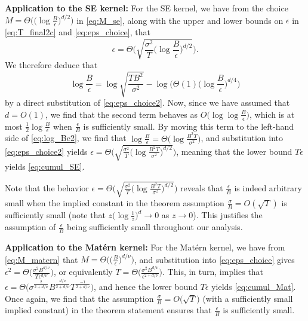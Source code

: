 \documentclass[english,onecolumn,final,11pt]{IEEEtran} %
\begin{document}
{\bf Application to the SE kernel:} For the SE kernel, we have from the choice $M = \Theta\big( \big(\log\frac{B}{\epsilon}\big)^{d/2} \big)$ in \eqref{eq:M_se}, along with the upper and lower bounds on $\epsilon$ in \eqref{eq:T_final2c} and \eqref{eq:eps_choice}, that 
\begin{equation}
    \epsilon = \Theta\bigg( \sqrt{\frac{\sigma^2}{T} \Big( \log\frac{B}{\epsilon} \Big)^{d/2} } \bigg). \label{eq:eps_choice2}
\end{equation}
We therefore deduce that
\begin{equation}
    \log\frac{B}{\epsilon} = \log\sqrt{\frac{TB^2}{\sigma^2}} - \log\bigg( \Theta(1) \Big( \log\frac{B}{\epsilon} \Big)^{d/4} \bigg) \label{eq:log_Be2}
\end{equation}
by a direct substitution of \eqref{eq:eps_choice2}.  Now, since we have assumed that $d = O(1)$, we find that the second term behaves as $O\big(\log\log\frac{B}{\epsilon}\big)$, which is at most $\frac{1}{2}\log\frac{B}{\epsilon}$ when $\frac{\epsilon}{B}$ is sufficiently small.  By moving this term to the left-hand side of \eqref{eq:log_Be2}, we find that $\log\frac{B}{\epsilon} = \Theta\big( \log\frac{B^2 T}{\sigma^2} \big)$, and substitution into \eqref{eq:eps_choice2} yields  $\epsilon = \Theta\big( \sqrt{\frac{\sigma^2}{T} \big( \log\frac{B^2 T}{\sigma^2} \big)^{d/2} } \big)$, meaning that the lower bound $T\epsilon$ yields \eqref{eq:cumul_SE}.  

Note that the behavior $\epsilon = \Theta\big( \sqrt{\frac{\sigma^2}{T} \big( \log\frac{B^2 T}{\sigma^2} \big)^{d/2} } \big)$ reveals that $\frac{\epsilon}{B}$ is indeed arbitrary small when the implied constant in the theorem assumption $\frac{\sigma}{B} = O(\sqrt{T})$ is sufficiently small (note that $z\big(\log\frac{1}{z}\big)^d \to 0$ as $z \to 0$).  This justifies the assumption of $\frac{\epsilon}{B}$ being sufficiently small throughout our analysis.

{\bf Application to the Mat\'ern kernel:} For the Mat\'ern kernel, we have from \eqref{eq:M_matern} that $M = \Theta\big( \big(\frac{B}{\epsilon}\big)^{d/\nu} \big)$, and substitution into \eqref{eq:eps_choice} gives $\epsilon^2 = \Theta\big( \frac{\sigma^2 B^{d/\nu}}{T\epsilon^{d/\nu} } \big)$, or equivalently $T = \Theta\big( \frac{\sigma^2 B^{d/\nu} }{\epsilon^{2+d/\nu}} \big)$.  This, in turn, implies that $\epsilon = \Theta\big( \sigma^{\frac{2}{2+d/\nu}} B^{\frac{d/\nu}{2+d/\nu}} T^{\frac{-1}{2+d/\nu}} \big)$, and hence the lower bound $T\epsilon$ yields \eqref{eq:cumul_Mat}.  Once again, we find that the assumption $\frac{\sigma}{B} = O\big(\sqrt{T}\big)$ (with a sufficiently small implied constant) in the theorem statement ensures that $\frac{\epsilon}{B}$ is sufficiently small.
\end{document}
